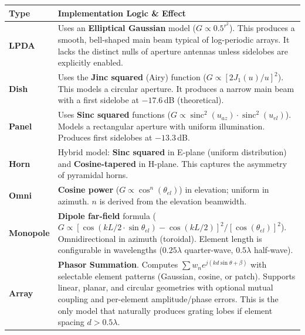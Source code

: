 \documentclass[11pt,a4paper]{article}
\DeclareMathOperator{\sinc}{sinc}
\begin{document}
\begin{longtable}{p{3cm} p{12cm}}
\toprule
\textbf{Type} & \textbf{Implementation Logic \& Effect} \\
\midrule
\textbf{LPDA} & Uses an \textbf{Elliptical Gaussian} model ($G \propto 0.5^{r^2}$). This produces a smooth, bell-shaped main beam typical of log-periodic arrays. It lacks the distinct nulls of aperture antennas unless sidelobes are explicitly enabled. \\
\textbf{Dish} & Uses the \textbf{Jinc squared} (Airy) function ($G \propto [2J_1(u)/u]^2$). This models a circular aperture. It produces a narrow main beam with a first sidelobe at $-17.6$\,dB (theoretical). \\
\textbf{Panel} & Uses \textbf{Sinc squared} functions ($G \propto \sinc ^2(u_{az}) \cdot \sinc^2(u_{el})$). Models a rectangular aperture with uniform illumination. Produces first sidelobes at $-13.3$\,dB. \\
\textbf{Horn} & Hybrid model: \textbf{Sinc squared} in E-plane (uniform distribution) and \textbf{Cosine-tapered} in H-plane. This captures the asymmetry of pyramidal horns. \\
\textbf{Omni} & \textbf{Cosine power} ($G \propto \cos^n(\theta_{el})$) in elevation; uniform in azimuth. $n$ is derived from the elevation beamwidth. \\
\textbf{Monopole} & \textbf{Dipole far-field} formula ($G \propto [\cos(kL/2 \cdot \sin\theta_{el}) - \cos(kL/2)]^2 / [\cos(\theta_{el})]^2$). Omnidirectional in azimuth (toroidal). Element length is configurable in wavelengths ($0.25\lambda$ quarter-wave, $0.5\lambda$ half-wave). \\
\textbf{Array} & \textbf{Phasor Summation}. Computes $\sum w_n e^{j(k d \sin \theta + \beta)}$ with selectable element patterns (Gaussian, cosine, or patch). Supports linear, planar, and circular geometries with optional mutual coupling and per-element amplitude/phase errors. This is the only model that naturally produces grating lobes if element spacing $d > 0.5\lambda$. \\
\bottomrule
\end{longtable}
\end{document}
